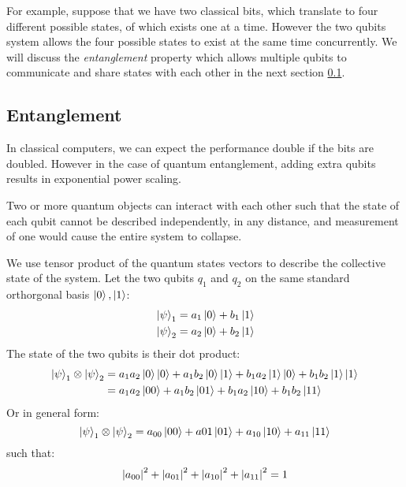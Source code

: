 For example, suppose that we have two classical bits, which translate to four different possible states, of which exists one at a time.
However the two qubits system allows the four possible states to exist at the same time concurrently.
We will discuss the \emph{entanglement} property which allows multiple qubits to communicate and share states with each other in the next section \ref{Sec: Entanglement}.

\subsection{Entanglement} \label{Sec: Entanglement}

In classical computers, we can expect the performance double if the bits are doubled.
However in the case of quantum entanglement, adding extra qubits results in exponential power scaling.

Two or more quantum objects can interact with each other such that the state of each qubit cannot be described independently, in any distance, and measurement of one would cause the entire system to collapse.

We use tensor product of the quantum states vectors to describe the collective state of the system.
Let the two qubits $q_1$ and $q_2$ on the same standard orthorgonal basis ${\left\vert{0}\right\rangle, \left\vert{1}\right\rangle}$:
\begin{equation}
    \begin{split}
        & \left\vert{\psi}\right\rangle_1 = a_1\left\vert{0}\right\rangle + b_1\left\vert{1}\right\rangle \\
        & \left\vert{\psi}\right\rangle_2 = a_2\left\vert{0}\right\rangle + b_2\left\vert{1}\right\rangle
    \end{split}
\end{equation}
The state of the two qubits is their dot product:
\begin{equation}
    \begin{split}
        \left\vert{\psi}\right\rangle_1\otimes\left\vert{\psi}\right\rangle_2
        & = a_1 a_2 \left\vert{0}\right\rangle\left\vert{0}\right\rangle + a_1 b_2 \left\vert{0}\right\rangle\left\vert{1}\right\rangle + b_1 a_2 \left\vert{1}\right\rangle \left\vert{0}\right\rangle + b_1 b_2 \left\vert{1}\right\rangle \left\vert{1}\right\rangle \\
        & = a_1 a_2 \left\vert{00}\right\rangle + a_1 b_2 \left\vert{01}\right\rangle + b_1 a_2 \left\vert{10}\right\rangle + b_1 b_2 \left\vert{11}\right\rangle
    \end{split}
\end{equation}
Or in general form:
\begin{equation}
    \left\vert{\psi}\right\rangle_1\otimes\left\vert{\psi}\right\rangle_2
    = a_{00} \left\vert{00}\right\rangle + a{01} \left\vert{01}\right\rangle + a_{10} \left\vert{10}\right\rangle + a_{11} \left\vert{11}\right\rangle
\end{equation}
such that:
\begin{equation}
    \abs{a_{00}}^2 + \abs{a_{01}}^2 + \abs{a_{10}}^2 + \abs{a_{11}}^2 = 1
\end{equation}

